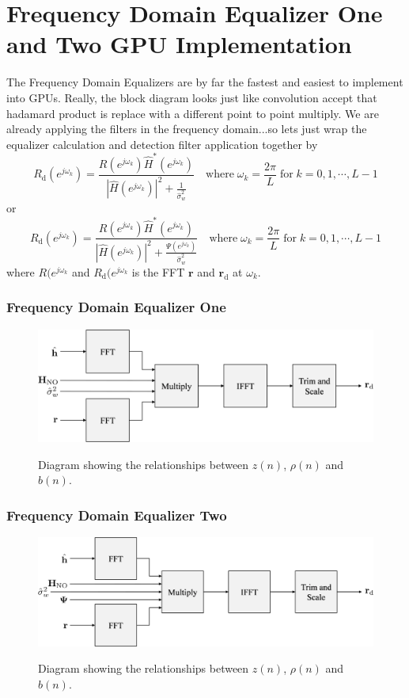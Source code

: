 \section{Frequency Domain Equalizer One and Two GPU Implementation}
The Frequency Domain Equalizers are by far the fastest and easiest to implement into GPUs.
Really, the block diagram looks just like convolution accept that hadamard product is replace with a different point to point multiply.
We are already applying the filters in the frequency domain...so lets just wrap the equalizer calculation and detection filter application together by
\begin{equation}
R_\text{d}(e^{j\omega_k}) = \frac{R(e^{j\omega_k}) \hat{H}^\ast(e^{j\omega_k})}  {|\hat{H}(e^{j\omega_k})|^2  +  \frac{1}{\hat{\sigma}^2_w}} \quad
\text{where} \;
\omega_k = \frac{2\pi}{L} \;
\text{for} \;
k=0,1,\cdots,L-1
\label{eq:FDE1_applied}
\end{equation}
or 
\begin{equation}
R_\text{d}(e^{j\omega_k}) = \frac{R(e^{j\omega_k}) \hat{H}^\ast(e^{j\omega_k})}  {|\hat{H}(e^{j\omega_k})|^2  +  \frac{\Psi(e^{j\omega_k})}{\hat{\sigma}^2_w}} \quad
\text{where} \;
\omega_k = \frac{2\pi}{L} \;
\text{for} \;
k=0,1,\cdots,L-1
\label{eq:FDE2_applied}
\end{equation}
where $R(e^{j\omega_k}$ and $R_\text{d}(e^{j\omega_k}$ is the FFT $\mathbf{r}$ and $\mathbf{r}_\text{d}$ 
at $\omega_k$.

\subsubsection{Frequency Domain Equalizer One}
\begin{figure}
	\caption{Diagram showing the relationships between $z(n)$, $\rho(n)$ and $b(n)$.}
	\centering\includegraphics[width=9.73in/100*55]{figures/eq_GPUimplementation/blockFDE1.pdf}
	\label{fig:blockFDE1}
\end{figure}
\subsubsection{Frequency Domain Equalizer Two}
\begin{figure}
	\caption{Diagram showing the relationships between $z(n)$, $\rho(n)$ and $b(n)$.}
	\centering\includegraphics[width=10.03in/100*55]{figures/eq_GPUimplementation/blockFDE2.pdf}
	\label{fig:blockFDE2}
\end{figure}






